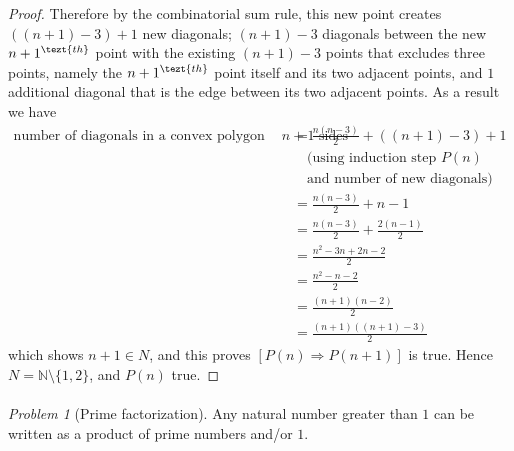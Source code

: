 \documentclass[11pt,twoside, reqno, align]{amsart}
\theoremstyle{remark}
\newtheorem{Prob}{Problem}
\def\N{\mathbb N}
\renewcommand{\implies}{\Rightarrow}
\begin{document}
\begin{proof}
Therefore by the combinatorial sum rule, this new point creates $((n+1)-3) + 1$ new diagonals; $(n+1)-3$ diagonals between the new ${n+1}^{\tezt{th}}$ point with the existing $(n+1)-3$ points that excludes three points, namely the ${n+1}^{\tezt{th}}$ point itself and its two adjacent points, and $1$ additional diagonal that is the edge between its two adjacent points. As a result we have
\begin{align*}
    \text{number of diagonals in a convex polygon with $n+1$ sides} & = \frac{n(n-3)}{2} + ((n+1)-3) + 1 \\
    &\quad \text{(using induction step $P(n)$} \\
    &\quad \text{and number of new diagonals)} \\
    & = \frac{n(n-3)}{2} + n - 1 \\
    & = \frac{n(n-3)}{2} + \frac{2(n-1)}{2} \\
    & = \frac{n^2-3n+2n-2}{2} \\
    & = \frac{n^2-n-2}{2} \\
    & = \frac{(n+1)(n-2)}{2} \\
    & = \frac{(n+1)((n+1)-3)}{2}
\end{align*}
which shows ${n+1} \in N$, and this proves $[P(n) \implies P(n+1)]$ is true. Hence $N = \N \setminus \{1,2\}$, and $P(n)$ true.
\end{proof}

\paragraph{}

\begin{Prob}[Prime factorization]
Any natural number greater than $1$ can be written as a product of prime numbers and/or $1$.
\end{Prob}
\end{document}
